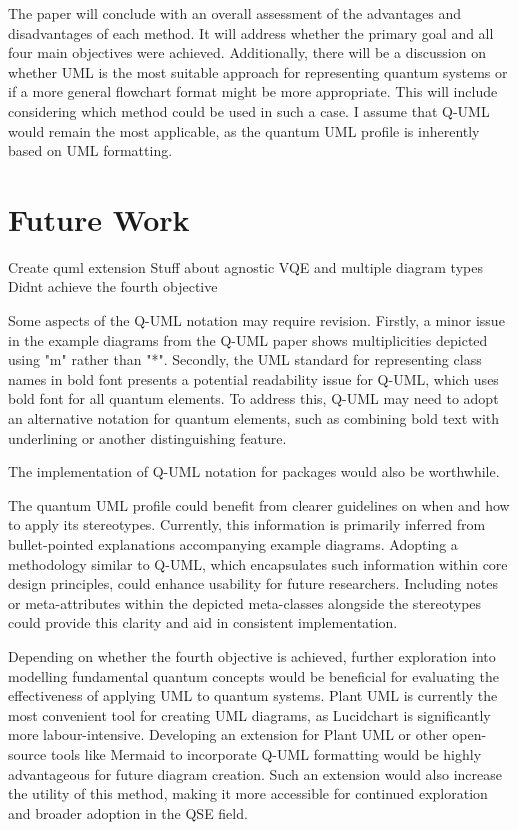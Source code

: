 \documentclass{article}
\begin{document}
The paper will conclude with an overall assessment of the advantages and disadvantages of each method. It will address whether the primary goal and all four main objectives were achieved. Additionally, there will be a discussion on whether UML is the most suitable approach for representing quantum systems or if a more general flowchart format might be more appropriate. This will include considering which method could be used in such a case. I assume that Q-UML would remain the most applicable, as the quantum UML profile is inherently based on UML formatting.

\section{Future Work}

Create quml extension
Stuff about agnostic VQE and multiple diagram types
Didnt achieve the fourth objective

Some aspects of the Q-UML notation may require revision. Firstly, a minor issue in the example diagrams from the Q-UML paper shows multiplicities depicted using "m" rather than "*". Secondly, the UML standard for representing class names in bold font\cite{Seidl_Scholz_Huemer_Kappel_Duffy_2014} presents a potential readability issue for Q-UML, which uses bold font for all quantum elements. To address this, Q-UML may need to adopt an alternative notation for quantum elements, such as combining bold text with underlining or another distinguishing feature.

The implementation of Q-UML notation for packages would also be worthwhile. 

The quantum UML profile could benefit from clearer guidelines on when and how to apply its stereotypes. Currently, this information is primarily inferred from bullet-pointed explanations accompanying example diagrams. Adopting a methodology similar to Q-UML, which encapsulates such information within core design principles, could enhance usability for future researchers. Including notes or meta-attributes within the depicted meta-classes alongside the stereotypes could provide this clarity and aid in consistent implementation.

Depending on whether the fourth objective is achieved, further exploration into modelling fundamental quantum concepts would be beneficial for evaluating the effectiveness of applying UML to quantum systems.
Plant UML is currently the most convenient tool for creating UML diagrams, as Lucidchart is significantly more labour-intensive. Developing an extension for Plant UML or other open-source tools like Mermaid to incorporate Q-UML formatting would be highly advantageous for future diagram creation. Such an extension would also increase the utility of this method, making it more accessible for continued exploration and broader adoption in the QSE field.
\end{document}

